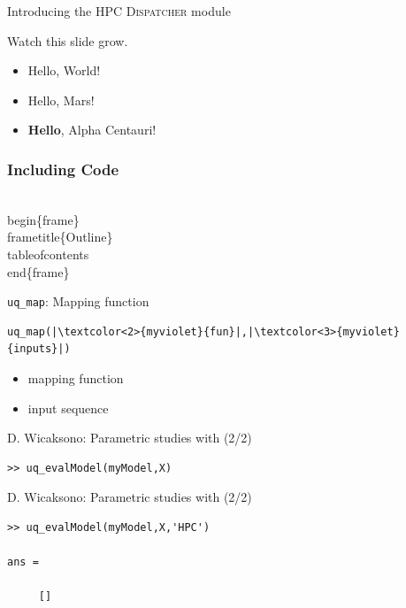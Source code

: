 \documentclass[]{rsuqbeamernew}
\begin{document}
\begin{frame}[fragile]{Introducing the HPC \textsc{Dispatcher} module}

Watch this slide grow.
\pause
\begin{itemize}
  \item<2-> Hello, World!
  \item<3-> Hello, Mars!
  \item<4-> \textbf<5->{Hello}, Alpha Centauri!
\end{itemize}
  
\end{frame}

\begin{frame}[fragile]
  \frametitle{Including Code}
  \begin{semiverbatim}
  \\begin\{frame\}
  \\frametitle\{Outline\}
  \\tableofcontents
  \\end\{frame\}
  \end{semiverbatim}
\end{frame}

\begin{frame}[fragile]{\texttt{uq\_map}: Mapping function}

\begin{lstlisting}
uq_map(|\textcolor<2>{myviolet}{fun}|,|\textcolor<3>{myviolet}{inputs}|)
\end{lstlisting}
\begin{itemize}
  \item \textcolor<2>{myviolet}{mapping function}
  \item \textcolor<3>{myviolet}{input sequence}
\end{itemize}

\end{frame}



  


\begin{frame}[fragile]{D. Wicaksono: Parametric studies with  (2/2)}

\begin{lstlisting}[basicstyle=\scriptsize,numbers=none]
>> uq_evalModel(myModel,X)

\end{lstlisting}
  
\end{frame}

\begin{frame}[fragile]{D. Wicaksono: Parametric studies with  (2/2)}

\begin{lstlisting}[basicstyle=\scriptsize,numbers=none]
>> uq_evalModel(myModel,X,'HPC')

ans =

     []
\end{lstlisting}


\end{frame}
\end{document}
